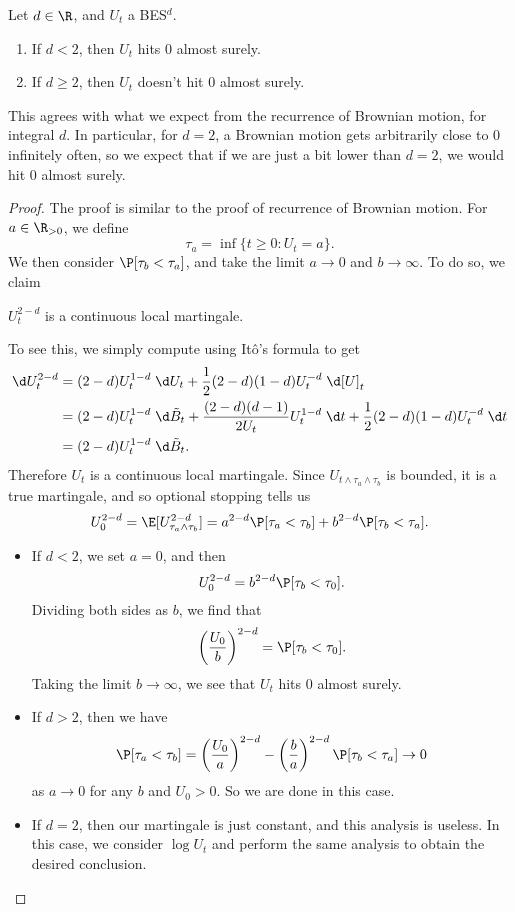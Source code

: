 \documentclass[a4paper]{article}
\begin{document}
\begin{prop}
  Let $d \in \R$, and $U_t$ a BES$^d$.
  \begin{enumerate}
    \item If $d < 2$, then $U_t$ hits $0$ almost surely.
    \item If $d \geq 2$, then $U_t$ doesn't hit $0$ almost surely.
  \end{enumerate}
\end{prop}
This agrees with what we expect from the recurrence of Brownian motion, for integral $d$. In particular, for $d = 2$, a Brownian motion gets arbitrarily close to $0$ infinitely often, so we expect that if we are just a bit lower than $d = 2$, we would hit $0$ almost surely.
\begin{proof}
  The proof is similar to the proof of recurrence of Brownian motion. For $a \in \R_{>0}$, we define
  \[
    \tau_a = \inf \{t \geq 0: U_t = a\}.
  \]
  We then consider $\P[\tau_b < \tau_a]$, and take the limit $a \to 0$ and $b \to \infty$. To do so, we claim
  \begin{claim}
    $U_t^{2 - d}$ is a continuous local martingale.
  \end{claim}

  To see this, we simply compute using It\^o's formula to get
  \begin{align*}
    \d U_t^{2 - d} &= (2 - d) U_t^{1 - d} \;\d U_t + \frac{1}{2} (2 - d) (1 - d) U_t^{-d} \;\d [U]_t\\
    &= (2 - d) U_t^{1 - d} \;\d \tilde{B}_t + \frac{(2 - d)(d - 1)}{2 U_t} U_t^{1 - d}\;\d t + \frac{1}{2} (2 - d)(1 - d) U_t^{-d}\;\d t\\
    &= (2 - d) U_t^{1 - d}\;\d \tilde{B}_t.
  \end{align*}
  Therefore $U_t$ is a continuous local martingale. Since $U_{t \wedge \tau_a \wedge \tau_b}$ is bounded, it is a true martingale, and so optional stopping tells us
  \[
    U_0^{2 - d} = \E [U_{\tau_a \wedge \tau_b}^{2 - d}] = a^{2 - d} \P[\tau_a < \tau_b] + b^{2 - d} \P[\tau_b < \tau_a].
  \]
  \begin{itemize}
    \item If $d < 2$, we set $a = 0$, and then
      \[
        U_0^{2 - d} = b^{2 - d} \P[\tau_b < \tau_0].
      \]
      Dividing both sides as $b$, we find that
      \[
        \left(\frac{U_0}{b}\right)^{2 - d} = \P[\tau_b < \tau_0].
      \]
      Taking the limit $b \to \infty$, we see that $U_t$ hits $0$ almost surely.
    \item If $d > 2$, then we have
      \[
        \P[\tau_a < \tau_b] = \left(\frac{U_0}{a}\right)^{2 - d} - \left(\frac{b}{a}\right)^{2 - d} \P[\tau_b < \tau_a] \to 0
      \]
      as $a \to 0$ for any $b$ and $U_0 > 0$. So we are done in this case.
    \item If $d = 2$, then our martingale is just constant, and this analysis is useless. In this case, we consider $\log U_t$ and perform the same analysis to obtain the desired conclusion.\qedhere
  \end{itemize}
\end{proof}
\end{document}
